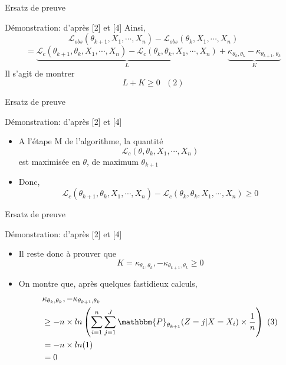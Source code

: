 \documentclass[11pt]{beamer}
\begin{document}
	\begin{frame}{Ersatz de preuve}
		\scriptsize
		\begin{block}{Démonstration: d'après [2] et [4]}
				Ainsi,
				\[
				\mathcal{L}_{obs}(\theta_{k+1}, X_1, \cdots, X_n) - \mathcal{L}_{obs}(\theta_k, X_1, \cdots, X_n)
				\]
				\[
				= \underbrace{\mathcal{L}_c(\theta_{k+1}, \theta_k, X_1, \cdots, X_n) - \mathcal{L}_c(\theta_k, \theta_k, X_1, \cdots, X_n)}_{L} + \underbrace{\kappa_{\theta_{k}, \theta_k}  - \kappa_{\theta_{k+1}, \theta_k}}_{K}
				\]
Il s'agit de montrer 
				\[
			L + K \geq 0 \text{   } (2)
				\]
		\end{block}
	\end{frame}


	\begin{frame}{Ersatz de preuve}
		\begin{block}{Démonstration: d'après [2] et [4]}
			\begin{itemize}
				\item A l'étape M de l'algorithme, la quantité 
					\[
					\mathcal{L}_c(\theta, \theta_k, X_1, \cdots, X_n)
					\]
est maximisée en $\theta$, de maximum $\theta_{k+1}$
				\item Donc,
					\[
					\mathcal{L}_c(\theta_{k+1}, \theta_k, X_1, \cdots, X_n) - \mathcal{L}_c(\theta_k, \theta_k, X_1, \cdots, X_n) \geq 0
					\]
			\end{itemize}
		\end{block}
	\end{frame}

	\begin{frame}{Ersatz de preuve}
		\begin{block}{Démonstration: d'après [2] et [4]}
			\begin{itemize}
				\item Il reste donc à prouver que
					\[
					 K = \kappa_{\theta_{k}, \theta_k}, - \kappa_{\theta_{k+1}, \theta_k} \geq 0
					\]
				\item On montre que, après quelques fastidieux calculs,
				\begin{align*}
					& \kappa_{\theta_{k}, \theta_k}, - \kappa_{\theta_{k+1}, \theta_k} \\
					& \geq - n\times ln\left( \sum_{i=1}^n\sum_{j=1}^J\mathbbm{P}_{\theta_{k+1}}(Z = j|X=X_i)\times\frac{1}{n}\right)  \text{  }  (3) \\
					&=  -n\times ln(1)\\
					&= 0
				\end{align*}
			\end{itemize}
		\end{block}
	\end{frame}
\end{document}
